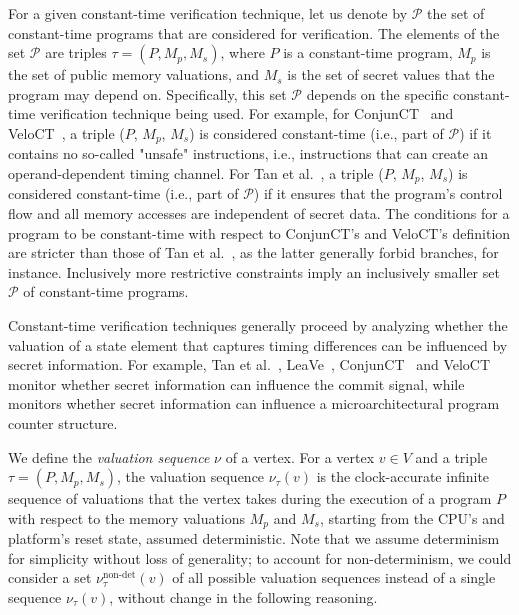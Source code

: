 For a given constant-time verification technique, let us denote by $\mathcal{P}$ the set of constant-time programs that are considered for verification.
The elements of the set $\mathcal{P}$ are triples $\tau = (P, M_p, M_s)$, where $P$ is a constant-time program, $M_p$ is the set of public memory valuations, and $M_s$ is the set of secret values that the program may depend on.
Specifically, this set $\mathcal{P}$ depends on the specific constant-time verification technique being used.
For example, for ConjunCT~\cite{dinesh2024conjunct} and VeloCT~\cite{dinesh2025h}, a triple ($P$, $M_p$, $M_s$) is considered constant-time (i.e., part of $\mathcal{P}$) if it contains no so-called "unsafe" instructions, i.e., instructions that can create an operand-dependent timing channel.
For Tan et al.~\cite{tan2025contractshadowlogic}, a triple ($P$, $M_p$, $M_s$) is considered constant-time (i.e., part of $\mathcal{P}$) if it ensures that the program's control flow and all memory accesses are independent of secret data.
The conditions for a program to be constant-time with respect to ConjunCT's and VeloCT's definition are stricter than those of Tan et al.~\cite{tan2025contractshadowlogic}, as the latter generally forbid branches, for instance.
Inclusively more restrictive constraints imply an inclusively smaller set $\mathcal{P}$ of constant-time programs.

Constant-time verification techniques generally proceed by analyzing whether the valuation of a state element that captures timing differences can be influenced by secret information.
For example, Tan et al.~\cite{tan2025contractshadowlogic}, LeaVe~\cite{wang2023specification}, ConjunCT~\cite{dinesh2024conjunct} and VeloCT~\cite{dinesh2025h} monitor whether secret information can influence the commit signal, while \ucfi~\cite{ceesay2024mucfi} monitors whether secret information can influence a microarchitectural program counter structure.

We define the \emph{valuation sequence} $\nu$ of a vertex.
For a vertex $v \in V$ and a triple $\tau = (P, M_p, M_s)$, the valuation sequence $\nu_\tau(v)$ is the clock-accurate infinite sequence of valuations that the vertex takes during the execution of a program $P$ with respect to the memory valuations $M_p$ and $M_s$, starting from the CPU's and platform's reset state, assumed deterministic.
Note that we assume determinism for simplicity without loss of generality; to account for non-determinism, we could consider a set $\nu_\tau^{\text{non-det}}(v)$ of all possible valuation sequences instead of a single sequence $\nu_\tau(v)$, without change in the following reasoning.

